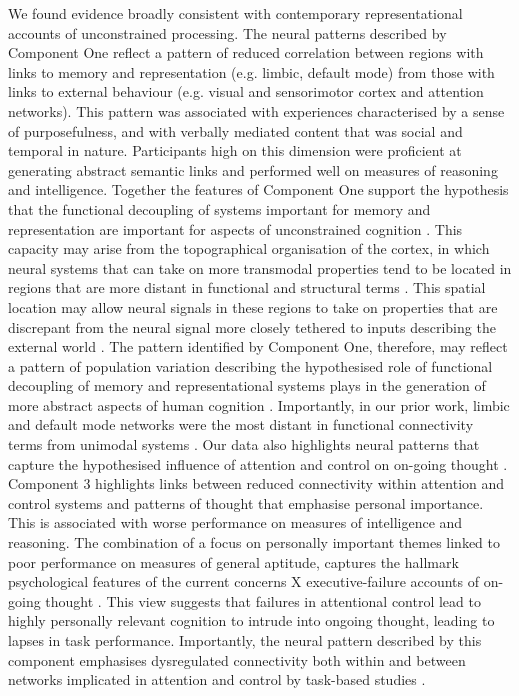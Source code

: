 We found evidence broadly consistent with contemporary representational accounts of unconstrained processing. The neural patterns described by Component One reflect a pattern of reduced correlation between regions with links to memory and representation (e.g. limbic, default mode) from those with links to external behaviour (e.g. visual and sensorimotor cortex and attention networks). This pattern was associated with experiences characterised by a sense of purposefulness, and with verbally mediated content that was social and temporal in nature. Participants high on this dimension were proficient at generating abstract semantic links and performed well on measures of reasoning and intelligence. Together the features of Component One support the hypothesis that the functional decoupling of systems important for memory and representation are important for aspects of unconstrained cognition \cite{Smallwood2013}. 
This capacity may arise from the topographical organisation of the cortex, in which neural systems that can take on more transmodal properties tend to be located in regions that are more distant in functional and structural terms \cite{Buckner2013,Margulies2016,Mesulam1998}. 
This spatial location may allow neural signals in these regions to take on properties that are discrepant from the neural signal more closely tethered to inputs describing the external world \cite{Buckner2013,Friston2013}. 
The pattern identified by Component One, therefore, may reflect a pattern of population variation describing the hypothesised role of functional decoupling of memory and representational systems plays in the generation of more abstract aspects of human cognition \cite{Margulies2016,Mesulam1998}. 
Importantly, in our prior work, limbic and default mode networks were the most distant in functional connectivity terms from unimodal systems \cite{Margulies2016}.
Our data also highlights neural patterns that capture the hypothesised influence of attention and control on on-going thought \cite{McVay2009}. 
Component 3 highlights links between reduced connectivity within attention and control systems and patterns of thought that emphasise personal importance. This is associated with worse performance on measures of intelligence and reasoning. The combination of a focus on personally important themes linked to poor performance on measures of general aptitude, captures the hallmark psychological features of the current concerns X executive-failure accounts of on-going thought \cite{McVay2009}. 
This view suggests that failures in attentional control lead to highly personally relevant cognition to intrude into ongoing thought, leading to lapses in task performance. Importantly, the neural pattern described by this component emphasises dysregulated connectivity both within and between networks implicated in attention and control by task-based studies \cite{Duncan2010}. 
